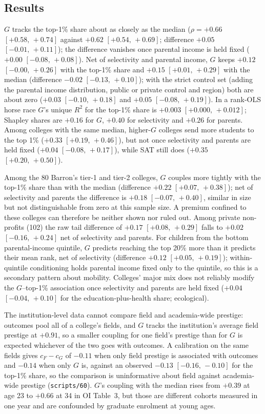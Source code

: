 \documentclass[11pt]{article}
\newcommand{\ci}[2]{$[#1,\allowbreak\,#2]$}
\newcommand{\scr}[1]{\texttt{scripts/#1}}
\begin{document}
\subsection{Results}\label{sec:oiresults}

$G$ tracks the top-1\% share about as closely as the median ($\rho=+0.66$ \ci{+0.58}{+0.74} against $+0.62$ \ci{+0.54}{+0.69}; difference
$+0.05$ \ci{-0.01}{+0.11}); the difference vanishes once parental income is held fixed ($+0.00$ \ci{-0.08}{+0.08}). Net of selectivity and
parental income, $G$ keeps $+0.12$ \ci{-0.00}{+0.26} with the top-1\% share and $+0.15$ \ci{+0.01}{+0.29} with the median (difference $-0.02$
\ci{-0.13}{+0.10}); with the strict control set (adding the parental income distribution, public or private control and region) both are
about zero ($+0.03$ \ci{-0.10}{+0.18} and $+0.05$ \ci{-0.08}{+0.19}). In a rank-OLS horse race $G$'s unique $R^2$ for the top-1\% share is $+0.003$
\ci{+0.000}{+0.012}; Shapley shares are $+0.16$ for $G$, $+0.40$ for selectivity and $+0.26$ for parents. Among colleges with the same median,
higher-$G$ colleges send more students to the top 1\% ($+0.33$ \ci{+0.19}{+0.46}), but not once selectivity and parents are held fixed
($+0.04$ \ci{-0.08}{+0.17}), while SAT still does ($+0.35$ \ci{+0.20}{+0.50}).

Among the 80 Barron's tier-1 and tier-2 colleges, $G$ couples more tightly with the top-1\% share than with the median (difference
$+0.22$ \ci{+0.07}{+0.38}); net of selectivity and parents the difference is $+0.18$ \ci{-0.07}{+0.40}, similar in size but not distinguishable
from zero at this sample size. A premium confined to these colleges can therefore be neither shown nor ruled out. Among private
non-profits (102) the raw tail difference of $+0.17$ \ci{+0.08}{+0.29} falls to $+0.02$ \ci{-0.16}{+0.24} net of selectivity and parents. For
children from the bottom parental-income quintile, $G$ predicts reaching the top 20\% more than it predicts their mean rank, net of
selectivity (difference $+0.12$ \ci{+0.05}{+0.19}); within-quintile conditioning holds parental income fixed only to the quintile, so this is
a secondary pattern about mobility. Colleges' major mix does not reliably modify the $G$--top-1\% association once selectivity and parents
are held fixed ($+0.04$ \ci{-0.04}{+0.10} for the education-plus-health share; ecological).

The institution-level data cannot compare field and academia-wide prestige: outcomes pool all of a college's fields, and $G$ tracks the
institution's average field prestige at $+0.91$, so a smaller coupling for one field's prestige than for $G$ is expected whichever of the
two goes with outcomes. A calibration on the same fields gives $c_F-c_G$ of $-0.11$ when only field prestige is associated with outcomes and $-0.14$
when only $G$ is, against an observed $-0.13$ \ci{-0.16}{-0.10} for the top-1\% share, so the comparison is uninformative
about field against academia-wide prestige (\scr{60}). $G$'s coupling with the median rises from $+0.39$ at age 23 to $+0.66$ at 34
in OI Table~3, but those are different cohorts measured in one year and are confounded by graduate enrolment at young ages.
\end{document}
